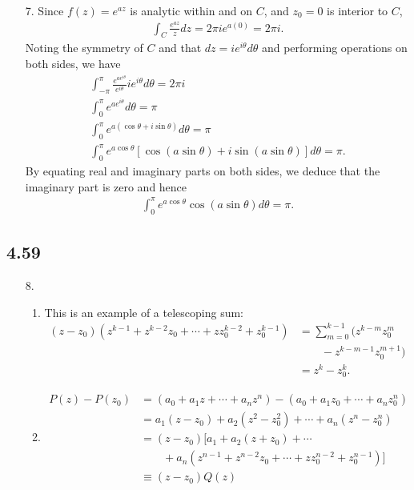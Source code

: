 \documentclass[a4paper,12pt]{article}
\begin{document}
\begin{enumerate}
    \item[7.]
        Since $f(z) = e^{az}$ is analytic within and on $C$, and $z_0 = 0$ is interior to $C$,
        \begin{align*}
            \int_C \frac{e^{az}}{z} dz = 2\pi i e^{a(0)} = 2\pi i.
        \end{align*}
        Noting the symmetry of $C$ and that $dz = ie^{i\theta} d\theta$ and performing operations on both sides, we have
        \begin{gather*}
            \int_{-\pi}^\pi \frac{e^{ae^{i\theta}}}{e^{i\theta}} ie^{i\theta} d\theta = 2\pi i \\
            \int_0^\pi e^{ae^{i\theta}} d\theta = \pi \\
            \int_0^\pi e^{a(\cos\theta + i\sin\theta)} d\theta = \pi \\
            \int_0^\pi e^{a\cos\theta} [\cos(a\sin\theta) + i\sin(a\sin\theta)] d\theta = \pi.
        \end{gather*}
        By equating real and imaginary parts on both sides, we deduce that the imaginary part is zero and hence
        \begin{gather*}
            \int_0^\pi e^{a\cos\theta} \cos(a\sin\theta) d\theta = \pi.
        \end{gather*}
\end{enumerate}

\subsection*{4.59}
\begin{enumerate}
    \item[8.]
        \begin{enumerate}
            \item
                This is an example of a telescoping sum:
                \begin{align*}
                    (z - z_0)(z^{k - 1} + z^{k - 2} z_0 + \cdots + z z_0^{k - 2} + z_0^{k - 1}) &= \sum_{m = 0}^{k - 1} (z^{k - m} z_0^m \\
                    &\qquad- z^{k - m - 1} z_0^{m + 1}) \\
                    &= z^k - z_0^k.
                \end{align*}

            \item
                \begin{align*}
                    P(z) - P(z_0) &= \left( a_0 + a_1 z + \cdots + a_n z^n \right) - \left( a_0 + a_1 z_0 + \cdots + a_n z_0^n \right) \\
                    &= a_1(z - z_0) + a_2(z^2 - z_0^2) + \cdots + a_n(z^n - z_0^n) \\
                    &= (z - z_0)[a_1 + a_2(z + z_0) + \cdots \\
                    &\qquad+ a_n(z^{n - 1} + z^{n - 2} z_0 + \cdots + z z_0^{n - 2} + z_0^{n - 1})] \\
                    &\equiv (z - z_0) Q(z)
                \end{align*}
        \end{enumerate}
\end{enumerate}
\end{document}
